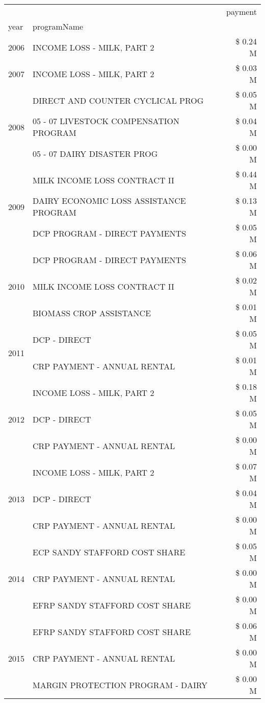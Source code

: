 \begin{tabular}{llr}
\toprule
 &  & payment \\
year & programName &  \\
\midrule
2006 & INCOME LOSS - MILK, PART 2 & \$ 0.24 M \\
\cline{1-3}
2007 & INCOME LOSS - MILK, PART 2 & \$ 0.03 M \\
\cline{1-3}
\multirow[t]{3}{*}{2008} & DIRECT AND COUNTER CYCLICAL PROG & \$ 0.05 M \\
 & 05 - 07 LIVESTOCK COMPENSATION PROGRAM & \$ 0.04 M \\
 & 05 - 07 DAIRY DISASTER PROG & \$ 0.00 M \\
\cline{1-3}
\multirow[t]{3}{*}{2009} & MILK INCOME LOSS CONTRACT II & \$ 0.44 M \\
 & DAIRY ECONOMIC LOSS ASSISTANCE PROGRAM & \$ 0.13 M \\
 & DCP PROGRAM - DIRECT PAYMENTS & \$ 0.05 M \\
\cline{1-3}
\multirow[t]{3}{*}{2010} & DCP PROGRAM - DIRECT PAYMENTS & \$ 0.06 M \\
 & MILK INCOME LOSS CONTRACT II & \$ 0.02 M \\
 & BIOMASS CROP ASSISTANCE & \$ 0.01 M \\
\cline{1-3}
\multirow[t]{2}{*}{2011} & DCP - DIRECT & \$ 0.05 M \\
 & CRP PAYMENT - ANNUAL RENTAL & \$ 0.01 M \\
\cline{1-3}
\multirow[t]{3}{*}{2012} & INCOME LOSS - MILK, PART 2 & \$ 0.18 M \\
 & DCP - DIRECT & \$ 0.05 M \\
 & CRP PAYMENT - ANNUAL RENTAL & \$ 0.00 M \\
\cline{1-3}
\multirow[t]{3}{*}{2013} & INCOME LOSS - MILK, PART 2 & \$ 0.07 M \\
 & DCP - DIRECT & \$ 0.04 M \\
 & CRP PAYMENT - ANNUAL RENTAL & \$ 0.00 M \\
\cline{1-3}
\multirow[t]{3}{*}{2014} & ECP SANDY STAFFORD COST SHARE & \$ 0.05 M \\
 & CRP PAYMENT - ANNUAL RENTAL & \$ 0.00 M \\
 & EFRP SANDY STAFFORD COST SHARE & \$ 0.00 M \\
\cline{1-3}
\multirow[t]{3}{*}{2015} & EFRP SANDY STAFFORD COST SHARE & \$ 0.06 M \\
 & CRP PAYMENT - ANNUAL RENTAL & \$ 0.00 M \\
 & MARGIN PROTECTION PROGRAM - DAIRY & \$ 0.00 M \\

\end{tabular}
